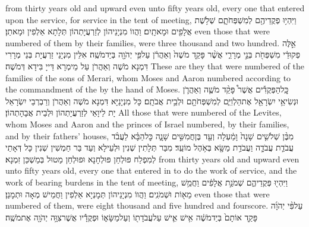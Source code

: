 {from thirty years old and upward even unto fifty years old, every one that entered upon the service, for service in the tent of meeting,}{}
{וַיִּהְי֥וּ פְקֻדֵיהֶ֖ם לְמִשְׁפְּחֹתָ֑ם שְׁלֹ֥שֶׁת אֲלָפִ֖ים וּמָאתָֽיִם׃}
{וַהֲווֹ מִנְיָנֵיהוֹן לְזַרְעֲיָתְהוֹן תְּלָתָא אַלְפִין וּמָאתַן׃}
{even those that were numbered of them by their families, were three thousand and two hundred.}{}
{אֵ֣לֶּה פְקוּדֵ֔י מִשְׁפְּחֹ֖ת בְּנֵ֣י מְרָרִ֑י אֲשֶׁ֨ר פָּקַ֤ד מֹשֶׁה֙ וְאַהֲרֹ֔ן עַל\maqqaf פִּ֥י יְהֹוָ֖ה בְּיַד\maqqaf מֹשֶֽׁה׃}
{אִלֵּין מִנְיָנֵי זַרְעֲיָת בְּנֵי מְרָרִי דִּמְנָא מֹשֶׁה וְאַהֲרֹן עַל מֵימְרָא דַּייָ בִּידָא דְּמֹשֶׁה׃}
{These are they that were numbered of the families of the sons of Merari, whom Moses and Aaron numbered according to the commandment of the \lord\space by the hand of Moses.}{}
{כׇּֽל\maqqaf הַפְּקֻדִ֡ים אֲשֶׁר֩ פָּקַ֨ד מֹשֶׁ֧ה וְאַהֲרֹ֛ן וּנְשִׂיאֵ֥י יִשְׂרָאֵ֖ל אֶת\maqqaf הַלְוִיִּ֑ם לְמִשְׁפְּחֹתָ֖ם וּלְבֵ֥ית אֲבֹתָֽם׃}
{כָּל מִנְיָנַיָּא דִּמְנָא מֹשֶׁה וְאַהֲרֹן וְרַבְרְבֵי יִשְׂרָאֵל יָת לֵיוָאֵי לְזַרְעֲיָתְהוֹן וּלְבֵית אֲבָהָתְהוֹן׃}
{All those that were numbered of the Levites, whom Moses and Aaron and the princes of Israel numbered, by their families, and by their fathers’ houses,}{}
{מִבֶּ֨ן שְׁלֹשִׁ֤ים שָׁנָה֙ וָמַ֔עְלָה וְעַ֖ד בֶּן\maqqaf חֲמִשִּׁ֣ים שָׁנָ֑ה כׇּל\maqqaf הַבָּ֗א לַעֲבֹ֨ד עֲבֹדַ֧ת עֲבֹדָ֛ה וַעֲבֹדַ֥ת מַשָּׂ֖א בְּאֹ֥הֶל מוֹעֵֽד׃}
{מִבַּר תְּלָתִין שְׁנִין וּלְעֵילָא וְעַד בַּר חַמְשִׁין שְׁנִין כָּל דְּאָתֵי לְמִפְלַח פּוּלְחַן פּוּלְחָנָא וּפוּלְחַן מַטוּל בְּמַשְׁכַּן זִמְנָא׃}
{from thirty years old and upward even unto fifty years old, every one that entered in to do the work of service, and the work of bearing burdens in the tent of meeting,}{}
{וַיִּהְי֖וּ פְּקֻדֵיהֶ֑ם שְׁמֹנַ֣ת אֲלָפִ֔ים וַחֲמֵ֥שׁ מֵא֖וֹת וּשְׁמֹנִֽים׃}
{וַהֲווֹ מִנְיָנֵיהוֹן תְּמָנְיָא אַלְפִין וַחֲמֵישׁ מְאָה וּתְמָנַן׃}
{even those that were numbered of them, were eight thousand and five hundred and fourscore.}{}
{עַל\maqqaf פִּ֨י יְהֹוָ֜ה פָּקַ֤ד אוֹתָם֙ בְּיַד\maqqaf מֹשֶׁ֔ה אִ֥ישׁ אִ֛ישׁ עַל\maqqaf עֲבֹדָת֖וֹ וְעַל\maqqaf מַשָּׂא֑וֹ וּפְקֻדָ֕יו אֲשֶׁר\maqqaf צִוָּ֥ה יְהֹוָ֖ה אֶת\maqqaf מֹשֶֽׁה׃ \petucha }
